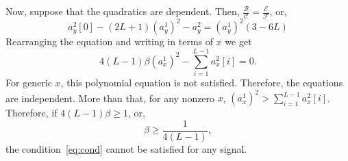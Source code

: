 \documentclass[english,11pt]{article}
\numberwithin{equation}{section}
\theoremstyle{plain}
\theoremstyle{definition}
\theoremstyle{remark}
\theoremstyle{plain}
\theoremstyle{remark}
\theoremstyle{plain}
\theoremstyle{plain}
\begin{document}
Now, suppose that the quadratics are dependent. Then, $\frac{\mathcal{B}}{\mathcal{C}} =\frac{\mathcal{E}}{\mathcal{F}} $, or, 	
\begin{equation*}
a_y^2[0] - (2L+1)(a_y^1)^2 - a_y^2 = (a_y^1)^2(3-6L)
\end{equation*}
Rearranging the equation and writing in terms of $x$ we get 
\begin{equation} \label{eq:cond}
4(L-1)\beta (a_x^1)^2  - \sum_{i=1}^{L-1} a_x^2[i] = 0.
\end{equation}	
For generic $x$,  this polynomial equation is not satisfied. Therefore,  the equations are independent. 
More than that, for any nonzero $x$, $(a_x^1)^2 >\sum_{i=1}^{L-1} a_x^2[i]$. Therefore, if $4(L-1)\beta \geq 1$, or,
\begin{equation*}
\beta \geq \frac{1}{4(L-1)},
\end{equation*}
the condition~\eqref{eq:cond} cannot be satisfied for any signal. 
\end{document}
